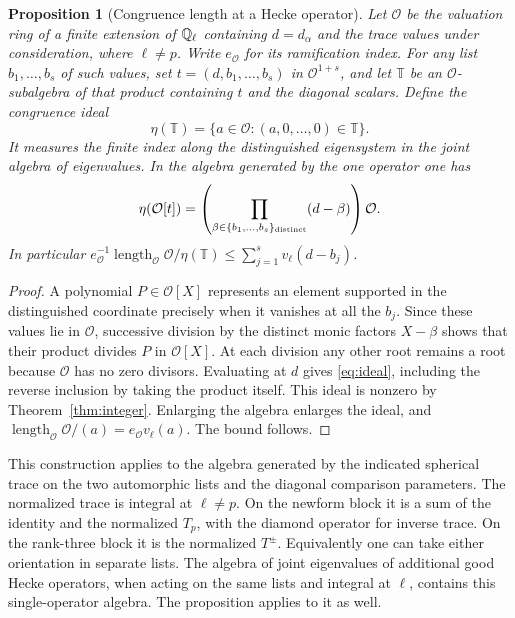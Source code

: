 \documentclass[a4paper,11pt]{article}
\newtheorem{proposition}{Proposition}[section]
\theoremstyle{definition}
\theoremstyle{remark}
\newcommand{\len}{\operatorname{length}}\newcommand{\Res}{\operatorname*{Res}}
\numberwithin{equation}{section}
\newcommand{\OO}{\mathcal O}
\begin{document}
\begin{proposition}[Congruence length at a Hecke operator]\label{prop:order}
Let \(\OO\) be the valuation ring of a finite extension of \(\mathbb Q_\ell\) containing \(d=d_\alpha\) and the trace values under consideration, where \(\ell\ne p\). Write \(e_{\OO}\) for its ramification index. For any list \(b_1,\ldots,b_s\) of such values, set \(t=(d,b_1,\ldots,b_s)\) in \(\OO^{1+s}\), and let \(\mathbb T\) be an \(\OO\)-subalgebra of that product containing \(t\) and the diagonal scalars. Define the congruence ideal
\[
   \eta(\mathbb T)=\{a\in\OO:(a,0,\ldots,0)\in\mathbb T\}.
\]
It measures the finite index along the distinguished eigensystem in the joint algebra of eigenvalues. In the algebra generated by the one operator one has
\begin{equation}
 \eta(\OO[t])=\left(\prod_{\beta\in\{b_1,\ldots,b_s\}_{\rm distinct}}
                                      (d-\beta)\right)\OO .
 \label{eq:ideal}
\end{equation}
In particular \(e_{\OO}^{-1}\len_{\OO}\OO/\eta(\mathbb T)\le\sum_{j=1}^s v_\ell(d-b_j)\).
\end{proposition}
\begin{proof}
A polynomial \(P\in\OO[X]\) represents an element supported in the distinguished coordinate precisely when it vanishes at all the \(b_j\). Since these values lie in \(\OO\), successive division by the distinct monic factors \(X-\beta\) shows that their product divides \(P\) in \(\OO[X]\). At each division any other root remains a root because \(\OO\) has no zero divisors. Evaluating at \(d\) gives \eqref{eq:ideal}, including the reverse inclusion by taking the product itself. This ideal is nonzero by Theorem~\ref{thm:integer}. Enlarging the algebra enlarges the ideal, and \(\len_{\OO}\OO/(a)=e_{\OO}v_\ell(a)\). The bound follows.
\end{proof}

This construction applies to the algebra generated by the indicated spherical trace on the two automorphic lists and the diagonal comparison parameters. The normalized trace is integral at \(\ell\ne p\). On the newform block it is a sum of the identity and the normalized \(T_p\), with the diamond operator for inverse trace. On the rank-three block it is the normalized \(T^\pm\). Equivalently one can take either orientation in separate lists. The algebra of joint eigenvalues of additional good Hecke operators, when acting on the same lists and integral at \(\ell\), contains this single-operator algebra. The proposition applies to it as well.
\end{document}
